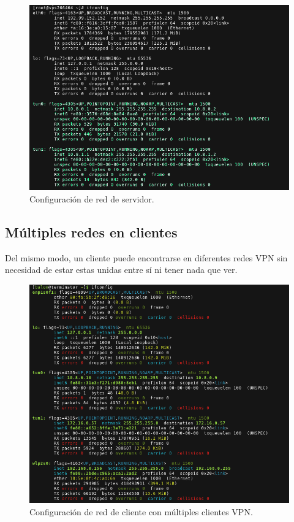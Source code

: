 \documentclass[a4paper, 11pt, titlepage]{article}
\begin{document}
        \begin{figure}[htp]
            \centering
            \includegraphics[width=1\textwidth]{resources/configs05.png}
            \caption{Configuración de red de servidor.}
            \label{fig:configs05}
        \end{figure} 

        \newpage
    \subsection{Múltiples redes en clientes}

        Del mismo modo, un cliente puede encontrarse en diferentes redes VPN sin necesidad de estar
        estas unidas entre sí ni tener nada que ver. 

        \begin{figure}[htp]
            \centering
            \includegraphics[width=1\textwidth]{resources/configs06.png}
            \caption{Configuración de red de cliente con múltiples clientes VPN.}
            \label{fig:configs05}
        \end{figure} 
\end{document}
